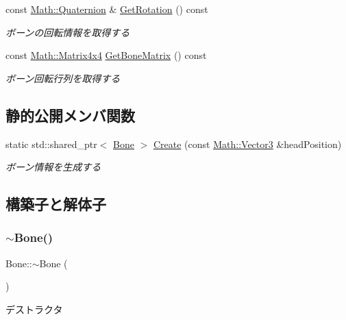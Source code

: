 \begin{DoxyCompactItemize}
const \mbox{\hyperlink{struct_math_1_1_quaternion}{Math\+::\+Quaternion}} \& \mbox{\hyperlink{class_bone_a4994c5b3c7412465cc78a6f9ac1d6e23}{Get\+Rotation}} () const
\begin{DoxyCompactList}\small\item\em ボーンの回転情報を取得する \end{DoxyCompactList}\item 
const \mbox{\hyperlink{struct_math_1_1_matrix4x4}{Math\+::\+Matrix4x4}} \mbox{\hyperlink{class_bone_ae87eaca1d2bd48b7f77668792686c5f8}{Get\+Bone\+Matrix}} () const
\begin{DoxyCompactList}\small\item\em ボーン回転行列を取得する \end{DoxyCompactList}\end{DoxyCompactItemize}
\subsection*{静的公開メンバ関数}
\begin{DoxyCompactItemize}
\item 
static std\+::shared\+\_\+ptr$<$ \mbox{\hyperlink{class_bone}{Bone}} $>$ \mbox{\hyperlink{class_bone_af837ae78ad27ca34d5adf52db611dc47}{Create}} (const \mbox{\hyperlink{struct_math_1_1_vector3}{Math\+::\+Vector3}} \&head\+Position)
\begin{DoxyCompactList}\small\item\em ボーン情報を生成する \end{DoxyCompactList}\end{DoxyCompactItemize}


\subsection{構築子と解体子}
\mbox{\label{class_bone_a8a85b84508716d1214f7fb69982d917c}} 
\subsubsection{\texorpdfstring{$\sim$\+Bone()}{~Bone()}}
{\footnotesize\ttfamily Bone\+::$\sim$\+Bone (\begin{DoxyParamCaption}{ }\end{DoxyParamCaption})}



デストラクタ 




